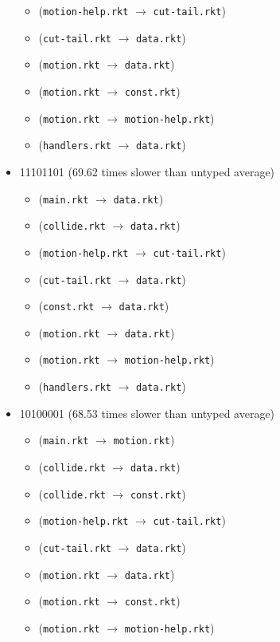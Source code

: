 \documentclass{article}
\newcommand{\mono}[1]{\texttt{#1}}
\begin{document}
\begin{itemize}
\begin{itemize}
  \item (\mono{motion-help.rkt} $\rightarrow$ \mono{cut-tail.rkt})
  \item (\mono{cut-tail.rkt} $\rightarrow$ \mono{data.rkt})
  \item (\mono{motion.rkt} $\rightarrow$ \mono{data.rkt})
  \item (\mono{motion.rkt} $\rightarrow$ \mono{const.rkt})
  \item (\mono{motion.rkt} $\rightarrow$ \mono{motion-help.rkt})
  \item (\mono{handlers.rkt} $\rightarrow$ \mono{data.rkt})
  \end{itemize}
\item 11101101 (69.62 times slower than untyped average)
  \begin{itemize}
  \item (\mono{main.rkt} $\rightarrow$ \mono{data.rkt})
  \item (\mono{collide.rkt} $\rightarrow$ \mono{data.rkt})
  \item (\mono{motion-help.rkt} $\rightarrow$ \mono{cut-tail.rkt})
  \item (\mono{cut-tail.rkt} $\rightarrow$ \mono{data.rkt})
  \item (\mono{const.rkt} $\rightarrow$ \mono{data.rkt})
  \item (\mono{motion.rkt} $\rightarrow$ \mono{data.rkt})
  \item (\mono{motion.rkt} $\rightarrow$ \mono{motion-help.rkt})
  \item (\mono{handlers.rkt} $\rightarrow$ \mono{data.rkt})
  \end{itemize}
\item 10100001 (68.53 times slower than untyped average)
  \begin{itemize}
  \item (\mono{main.rkt} $\rightarrow$ \mono{motion.rkt})
  \item (\mono{collide.rkt} $\rightarrow$ \mono{data.rkt})
  \item (\mono{collide.rkt} $\rightarrow$ \mono{const.rkt})
  \item (\mono{motion-help.rkt} $\rightarrow$ \mono{cut-tail.rkt})
  \item (\mono{cut-tail.rkt} $\rightarrow$ \mono{data.rkt})
  \item (\mono{motion.rkt} $\rightarrow$ \mono{data.rkt})
  \item (\mono{motion.rkt} $\rightarrow$ \mono{const.rkt})
  \item (\mono{motion.rkt} $\rightarrow$ \mono{motion-help.rkt})

\end{itemize}
\end{itemize}
\end{document}
